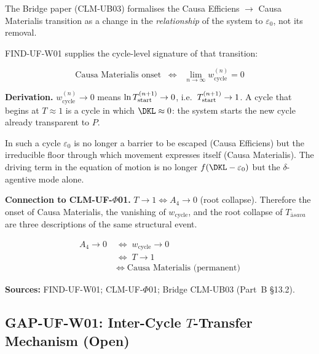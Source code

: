 \documentclass[12pt, a4paper]{article}
\providecommand{\eps}{\varepsilon_0}
\providecommand{\Tasava}{T_{\bar{\mathrm{a}}sava}}
\providecommand{\wcyc}{w_{\mathrm{cycle}}}
\providecommand{\Tasava}{\mathcal{T}_{\!\mathrm{\bar{a}sava}}}
\begin{document}

\begin{derivedbox}[title={FIND-UF-W02: Causa Materialis Onset
  $\Leftrightarrow$ $\wcyc \to 0$}]

The Bridge paper (CLM-UB03) formalises the Causa Efficiens $\to$
Causa Materialis transition as a change in the \emph{relationship}
of the system to $\eps$, not its removal.

FIND-UF-W01 supplies the cycle-level signature of that transition:

\[
  \text{Causa Materialis onset}
  \;\;\Longleftrightarrow\;\;
  \lim_{n\to\infty} \wcyc^{(n)} = 0
\]

\textbf{Derivation.}
$\wcyc^{(n)} \to 0$ means
$\ln T^{(n+1)}_{\rm start} \to 0$,
i.e.\ $T^{(n+1)}_{\rm start} \to 1$.
A cycle that begins at $T \approx 1$ is a cycle in which
$\DKL \approx 0$: the system starts the new cycle already
transparent to $P$.

In such a cycle $\eps$ is no longer a barrier to be escaped
(Causa Efficiens) but the irreducible floor through which
movement expresses itself (Causa Materialis). The driving term
in the equation of motion is no longer $f(\DKL - \eps)$ but
the $\delta$-agentive mode alone.

\textbf{Connection to CLM-UF-$\Phi$01.}
$T \to 1 \Leftrightarrow A_4 \to 0$ (root collapse).
Therefore the onset of Causa Materialis, the vanishing of
$\wcyc$, and the root collapse of $\Tasava$ are three
descriptions of the same structural event.

\begin{align*}
  A_4 \to 0
  \;&\Longleftrightarrow\;
  \wcyc \to 0\\
  \;&\Longleftrightarrow\;
  T \to 1\\
  \;&\Longleftrightarrow\;
  \text{Causa Materialis (permanent)}
\end{align*}

\textbf{Sources:} FIND-UF-W01; CLM-UF-$\Phi$01;
Bridge CLM-UB03 (Part~B \S13.2).
\end{derivedbox}

\subsection{GAP-UF-W01: Inter-Cycle \texorpdfstring{$T$}{T}-Transfer Mechanism (Open)}

\end{document}
